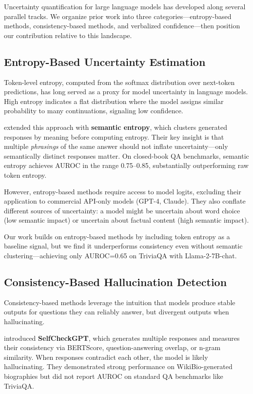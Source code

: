Uncertainty quantification for large language models has developed along several parallel tracks. We organize prior work into three categories---entropy-based methods, consistency-based methods, and verbalized confidence---then position our contribution relative to this landscape.

\subsection{Entropy-Based Uncertainty Estimation}

Token-level entropy, computed from the softmax distribution over next-token predictions, has long served as a proxy for model uncertainty in language models. High entropy indicates a flat distribution where the model assigns similar probability to many continuations, signaling low confidence.

\citet{kuhn2023semantic} extended this approach with \textbf{semantic entropy}, which clusters generated responses by meaning before computing entropy. Their key insight is that multiple \emph{phrasings} of the same answer should not inflate uncertainty---only semantically distinct responses matter. On closed-book QA benchmarks, semantic entropy achieves AUROC in the range 0.75--0.85, substantially outperforming raw token entropy.

However, entropy-based methods require access to model logits, excluding their application to commercial API-only models (GPT-4, Claude). They also conflate different sources of uncertainty: a model might be uncertain about word choice (low semantic impact) or uncertain about factual content (high semantic impact).

Our work builds on entropy-based methods by including token entropy as a baseline signal, but we find it underperforms consistency even without semantic clustering---achieving only AUROC=0.65 on TriviaQA with Llama-2-7B-chat.

\subsection{Consistency-Based Hallucination Detection}

Consistency-based methods leverage the intuition that models produce stable outputs for questions they can reliably answer, but divergent outputs when hallucinating.

\citet{manakul2023selfcheckgpt} introduced \textbf{SelfCheckGPT}, which generates multiple responses and measures their consistency via BERTScore, question-answering overlap, or n-gram similarity. When responses contradict each other, the model is likely hallucinating. They demonstrated strong performance on WikiBio-generated biographies but did not report AUROC on standard QA benchmarks like TriviaQA.

